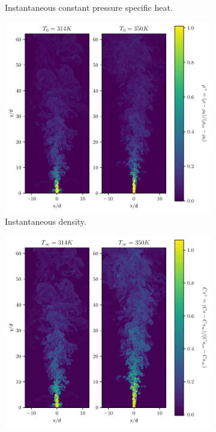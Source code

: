 \begin{figure}[H]
\begin{subfigure}{0.5\textwidth}
	\caption{Instantaneous constant pressure specific heat.} \label{noniso_cp_1}
\end{subfigure}
\vfill
\begin{subfigure}{0.5\textwidth}
	\centering
	\includegraphics[scale=.45]{figures/Plots/vertical/rho_scaled_vert_noniso.pdf}
	\caption{Instantaneous density.} \label{noniso_rho_1}
\end{subfigure}
\hfill
\begin{subfigure}{0.5\textwidth}
	\centering
	\includegraphics[scale=.45]{figures/Plots/vertical/Cs_scaled_vert_noniso.pdf}

\end{subfigure}
\end{figure}
